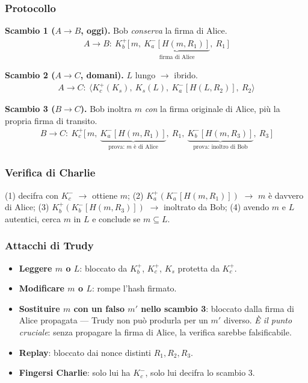 \documentclass[11pt,a4paper]{report}
\begin{document}
\subsubsection*{Protocollo}
\noindent\textbf{Scambio 1 ($A \to B$, oggi).} Bob \emph{conserva} la firma di Alice.
\begin{align*}
  A \to B:\ K_b^+\Big[\, m,\ \underbrace{K_a^-[H(m, R_1)]}_\text{firma di Alice},\ R_1 \,\Big]
\end{align*}

\noindent\textbf{Scambio 2 ($A \to C$, domani).} $L$ lungo $\to$ ibrido.
\begin{align*}
  A \to C:\ \Big\langle K_c^+(K_s),\ K_s(L),\ K_a^-[H(L, R_2)],\ R_2 \Big\rangle
\end{align*}

\noindent\textbf{Scambio 3 ($B \to C$).} Bob inoltra $m$ \emph{con} la firma
originale di Alice, più la propria firma di transito.
\begin{align*}
  B \to C:\ K_c^+\Big[\, m,\ \underbrace{K_a^-[H(m, R_1)]}_\text{prova: $m$ è di Alice},\ R_1,\ \underbrace{K_b^-[H(m, R_3)]}_\text{prova: inoltro di Bob},\ R_3 \,\Big]
\end{align*}

\subsubsection*{Verifica di Charlie}
(1) decifra con $K_c^-$ $\to$ ottiene $m$; (2) $K_a^+(K_a^-[H(m,R_1)])$ $\to$ $m$
è davvero di Alice; (3) $K_b^+(K_b^-[H(m,R_3)])$ $\to$ inoltrato da Bob; (4) avendo
$m$ e $L$ autentici, cerca $m$ in $L$ e conclude se $m \subseteq L$.

\subsubsection*{Attacchi di Trudy}
\begin{itemize}[noitemsep]
\item \textbf{Leggere $m$ o $L$}: bloccato da $K_b^+$, $K_c^+$, $K_s$ protetta da $K_c^+$.
\item \textbf{Modificare $m$ o $L$}: rompe l'hash firmato.
\item \textbf{Sostituire $m$ con un falso $m'$ nello scambio 3}: bloccato dalla
firma di Alice propagata --- Trudy non può produrla per un $m'$ diverso.
\emph{È il punto cruciale}: senza propagare la firma di Alice, la verifica sarebbe
falsificabile.
\item \textbf{Replay}: bloccato dai nonce distinti $R_1, R_2, R_3$.
\item \textbf{Fingersi Charlie}: solo lui ha $K_c^-$, solo lui decifra lo scambio 3.
\end{itemize}
\end{document}
